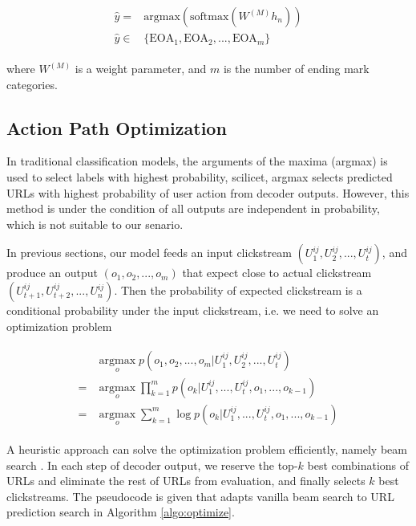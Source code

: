 \begin{align}
\label{eqn:lstm}
\begin{split}
    \hat{y} =& \text{argmax} (\text{softmax} (W^{(M)} h_n)) \\
    \hat{y} \in& \{ \text{EOA}_1, \text{EOA}_2, ..., \text{EOA}_m \}
\end{split}
\end{align}

where $W^{(M)}$ is a weight parameter, and $m$ is the number of ending mark categories.

\subsection{Action Path Optimization}

In traditional classification models, the arguments of the maxima (argmax) is used to select
labels with highest probability, scilicet, argmax selects predicted URLs with highest probability
of user action from decoder outputs. However, this method is under the condition of all outputs
are independent in probability, which is not suitable to our senario.

In previous sections, our model feeds an input clickstream $(U^{ij}_1, U^{ij}_2, ..., U^{ij}_t)$,
and produce an output $(o_1, o_2, ..., o_{m})$ that expect close to actual clickstream $(U^{ij}_{t+1}, U^{ij}_{t+2}, ..., U^{ij}_n)$.
Then the probability of expected clickstream is 
a conditional probability under the input clickstream, i.e. we need to solve an optimization problem

\begin{align}
\label{eqn:lstm}
\begin{split}
    & \operatorname*{argmax}_{o} p( o_1, o_2, ..., o_{m} | U^{ij}_1, U^{ij}_2, ..., U^{ij}_t ) \\
   =& \operatorname*{argmax}_{o} \prod_{k=1}^{m} p(o_{k} | U^{ij}_1, ..., U^{ij}_t, o_1, ..., o_{k-1}) \\
   =& \operatorname*{argmax}_{o} \sum_{k=1}^{m} \log p(o_{k} | U^{ij}_1, ..., U^{ij}_t, o_1, ..., o_{k-1})
\end{split}
\end{align}

A heuristic approach can solve the optimization problem efficiently, 
namely beam search \cite{DBLP:journals/corr/abs-1211-3711}. 
In each step of decoder output, we reserve the top-$k$ best combinations of URLs and eliminate the rest of
URLs from evaluation, and finally selects $k$ best clickstreams.
The pseudocode is given that adapts vanilla beam search to URL prediction search in Algorithm \ref{algo:optimize}.

